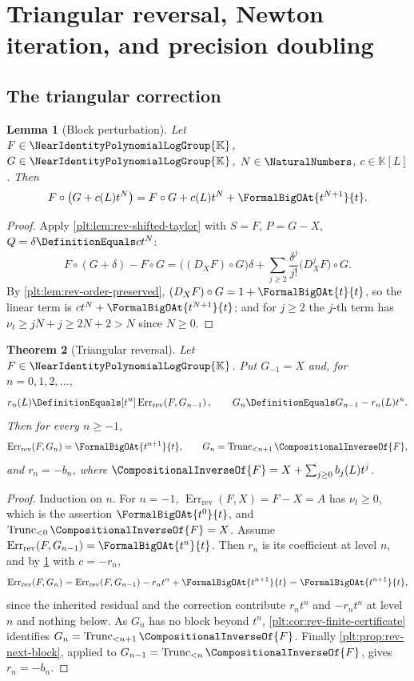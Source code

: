\documentclass[11pt,oneside]{article}
\theoremstyle{plain}
\newtheorem{theorem}{Theorem}[section]
\newtheorem{lemma}[theorem]{Lemma}
\theoremstyle{definition}
\theoremstyle{remark}
\newcommand{\K}{\mathbb{K}}
\newcommand{\Gnear}{\NearIdentityPolynomialLogGroup{\K}} %
\newcommand{\ordt}{\nu_{t}}                              %
\newcommand{\Trunc}[2]{\operatorname{Trunc}_{<#2}#1}     %
\newcommand{\DX}{D_{X}}                                  %
\newcommand{\compose}{\mathbin{\circ}}
\newcommand{\rev}[1]{\CompositionalInverseOf{#1}}
\newcommand{\RevErr}[2]{\operatorname{Err}_{\mathrm{rev}}\!\left(#1,#2\right)}
\begin{document}
\section{Triangular reversal, Newton iteration, and precision doubling}
\label{plt:sec:reversion-algorithms}

\subsection{The triangular correction}
\label{plt:sec:rev-triangular}

\begin{lemma}[Block perturbation]
\label{plt:lem:rev-block-perturbation}
Let \(F\in\Gnear\), \(G\in\Gnear\), \(N\in\NaturalNumbers\), \(c\in\K[L]\).
Then
\begin{equation}\label{plt:eq:rev-block-perturbation}
 F\compose\bigl(G+c(L)t^N\bigr)
 =F\compose G+c(L)t^N+\FormalBigOAt{t^{N+1}}{t}.
\end{equation}
\end{lemma}

\begin{proof}
Apply \cref{plt:lem:rev-shifted-taylor} with \(S=F\), \(P=G-X\),
\(Q=\delta\DefinitionEquals ct^N\):
\[
 F\compose(G+\delta)-F\compose G
 =\bigl((\DX F)\compose G\bigr)\delta
 +\sum_{j\ge2}\frac{\delta^j}{j!}\bigl(\DX^jF\bigr)\compose G .
\]
By \cref{plt:lem:rev-order-preserved}, \((\DX F)\compose G=1+\FormalBigOAt{t}{t}\),
so the linear term is \(ct^N+\FormalBigOAt{t^{N+1}}{t}\); and for \(j\ge2\) the
\(j\)-th term has \(\ordt\ge jN+j\ge2N+2>N\) since \(N\ge0\).
\end{proof}

\begin{theorem}[Triangular reversal]
\label{plt:thm:rev-triangular}
Let \(F\in\Gnear\).  Put \(G_{-1}=X\) and, for \(n=0,1,2,\dots\),
\begin{equation}\label{plt:eq:rev-triangular-step}
 r_n(L)\DefinitionEquals[t^n]\RevErr{F}{G_{n-1}},
 \qquad
 G_n\DefinitionEquals G_{n-1}-r_n(L)t^n .
\end{equation}
Then for every \(n\ge-1\),
\[
 \RevErr{F}{G_n}=\FormalBigOAt{t^{n+1}}{t},
 \qquad
 G_n=\Trunc{\rev{F}}{n+1},
\]
and \(r_n=-b_n\), where \(\rev{F}=X+\sum_{j\ge0}b_j(L)t^j\).
\end{theorem}

\begin{proof}
Induction on \(n\).  For \(n=-1\), \(\RevErr{F}{X}=F-X=A\) has \(\ordt\ge0\),
which is the assertion \(\FormalBigOAt{t^{0}}{t}\), and
\(\Trunc{\rev{F}}{0}=X\).  Assume
\(\RevErr{F}{G_{n-1}}=\FormalBigOAt{t^{n}}{t}\).  Then \(r_n\) is its
coefficient at level \(n\), and by \cref{plt:lem:rev-block-perturbation} with
\(c=-r_n\),
\[
 \RevErr{F}{G_n}=\RevErr{F}{G_{n-1}}-r_nt^n+\FormalBigOAt{t^{n+1}}{t}
 =\FormalBigOAt{t^{n+1}}{t},
\]
since the inherited residual and the correction contribute \(r_nt^n\) and
\(-r_nt^n\) at level \(n\) and nothing below.  As \(G_n\) has no block beyond
\(t^n\), \cref{plt:cor:rev-finite-certificate} identifies
\(G_n=\Trunc{\rev{F}}{n+1}\).  Finally \cref{plt:prop:rev-next-block}, applied
to \(G_{n-1}=\Trunc{\rev{F}}{n}\), gives \(r_n=-b_n\).
\end{proof}
\end{document}
